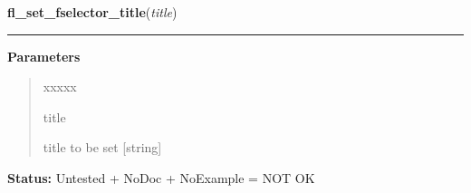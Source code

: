 \hspace{.8\funcindent}\begin{boxedminipage}{\funcwidth}

    \raggedright \textbf{fl\_set\_fselector\_title}(\textit{title})

    \vspace{-1.5ex}

    \rule{\textwidth}{0.5\fboxrule}
\setlength{\parskip}{2ex}
\setlength{\parskip}{1ex}
      \textbf{Parameters}
      \vspace{-1ex}

      \begin{quote}
        \begin{Ventry}{xxxxx}

          \item[title]

          title to be set [string]

        \end{Ventry}

      \end{quote}

\textbf{Status:} Untested + NoDoc + NoExample = NOT OK



    \end{boxedminipage}

    \label{xformslib:library:fl_goodies_atclose}

    \vspace{0.5ex}


